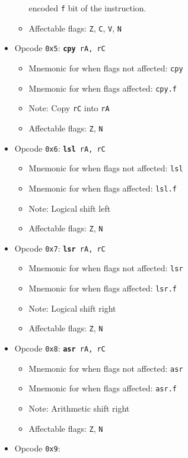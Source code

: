 \documentclass{article}
\begin{document}
\begin{itemize}
\begin{itemize}
			encoded \texttt{f} bit of the instruction.
			\item Affectable flags:
				\texttt{Z}, \texttt{C}, \texttt{V}, \texttt{N}
		\end{itemize}
		\item Opcode \texttt{0x5}:
			\texttt{\textbf{cpy} rA, rC}
		\begin{itemize}
			\item Mnemonic for when flags not affected: \texttt{cpy}
			\item Mnemonic for when flags affected: \texttt{cpy.f}
			\item Note: Copy \texttt{rC} into \texttt{rA}
			\item Affectable flags:
				\texttt{Z}, \texttt{N}
		\end{itemize}
		\item Opcode \texttt{0x6}:
			\texttt{\textbf{lsl} rA, rC}
		\begin{itemize}
			\item Mnemonic for when flags not affected: \texttt{lsl}
			\item Mnemonic for when flags affected: \texttt{lsl.f}
			\item Note: Logical shift left
			\item Affectable flags:
				\texttt{Z}, \texttt{N}
		\end{itemize}
		\item Opcode \texttt{0x7}:
			\texttt{\textbf{lsr} rA, rC}
		\begin{itemize}
			\item Mnemonic for when flags not affected: \texttt{lsr}
			\item Mnemonic for when flags affected: \texttt{lsr.f}
			\item Note: Logical shift right
			\item Affectable flags:
				\texttt{Z}, \texttt{N}
		\end{itemize}
		\item Opcode \texttt{0x8}:
			\texttt{\textbf{asr} rA, rC}
		\begin{itemize}
			\item Mnemonic for when flags not affected: \texttt{asr}
			\item Mnemonic for when flags affected: \texttt{asr.f}
			\item Note: Arithmetic shift right
			\item Affectable flags:
				\texttt{Z}, \texttt{N}
		\end{itemize}
		\item Opcode \texttt{0x9}:

\end{itemize}
\end{document}
